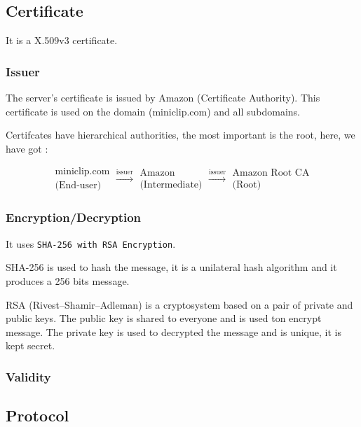 \documentclass{article}
\begin{document}
\subsection{Certificate}
\label{sub:certificate}

It is a X.509v3 certificate.

\subsubsection{Issuer}
The server's certificate is issued by Amazon (Certificate Authority). This certificate is used on the domain (miniclip.com) and all subdomains.

Certifcates have hierarchical authorities, the most important is the root, here, we have got :

\[
    \begin{array}{c}
        \text{miniclip.com}\\\text{(End-user)}
    \end{array}
    \xrightarrow[]{\text{issuer}}
    \begin{array}{c}
        \text{Amazon}\\\text{(Intermediate)}
    \end{array}
    \xrightarrow[]{\text{issuer}}
    \begin{array}{c}
        \text{Amazon Root CA}\\\text{(Root)}
    \end{array}
\]


\subsubsection{Encryption/Decryption}
It uses \texttt{SHA-256 with RSA Encryption}.

SHA-256 is used to hash the message, it is a unilateral hash algorithm and it produces a 256 bits message.

RSA (Rivest–Shamir–Adleman) is a cryptosystem based on a pair of private and public keys. The public key is shared to everyone and is used ton encrypt message. The private key is used to decrypted the message and is unique, it is kept secret.


\subsubsection{Validity}

\subsection{Protocol}
\label{sub:protocol}




\end{document}
